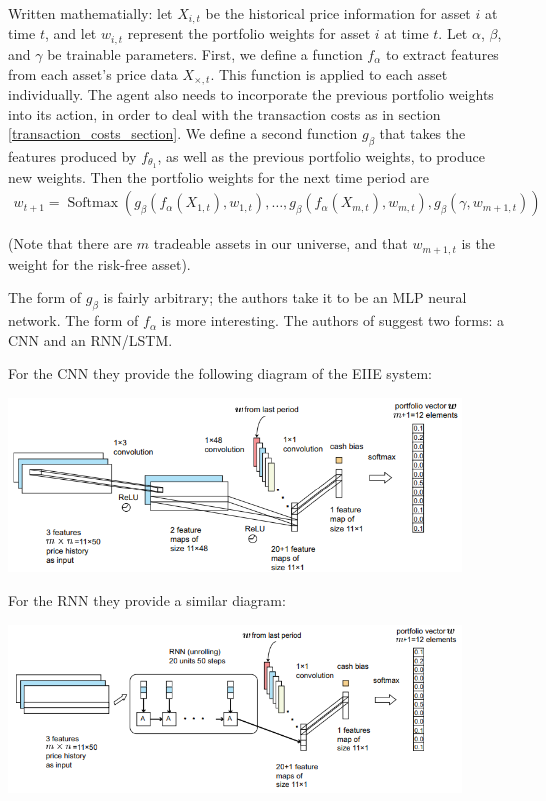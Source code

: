 Written mathematially: let $X_{i,t}$ be the historical price information for asset $i$ at time $t$, and
let $w_{i,t}$ represent the portfolio weights for asset $i$ at time $t$.
Let $\alpha$, $\beta$, and $\gamma$ be trainable parameters.
First, we define a function $f_\alpha$ to extract features from each asset's price data $X_{\times, t}$. This function is applied to each asset individually.
The agent also needs to incorporate the previous portfolio weights into its action, in order to deal with the transaction costs as in section \ref{transaction_costs_section}.
We define a second function $g_\beta$ that takes the features produced by $f_{\theta_1}$, as well as the previous portfolio weights, to produce new weights.
Then the portfolio weights for the next time period are
\begin{align*}
  w_{t+1} = \mathop{\mathrm{Softmax}}(g_\beta(f_\alpha(X_{1,t}), w_{1,t}), \ldots, g_\beta(f_\alpha(X_{m,t}), w_{m,t}), g_\beta(\gamma, w_{m+1,t}))
\end{align*}

(Note that there are $m$ tradeable assets in our universe, and that $w_{m+1, t}$ is the weight for the risk-free asset).

The form of $g_\beta$ is fairly arbitrary; the authors take it to be an MLP neural network.
The form of $f_\alpha$ is more interesting. The authors of \cite{drl_framework} suggest two forms: a CNN and an RNN/LSTM.

For the CNN they provide the following diagram of the EIIE system:

\begin{center}
  \includegraphics[width=0.9\textwidth]{cnn_eiie_diagram.png}
\end{center}

For the RNN they provide a similar diagram:

\begin{center}
  \includegraphics[width=0.9\textwidth]{rnn_eiie_diagram.png}
\end{center}

